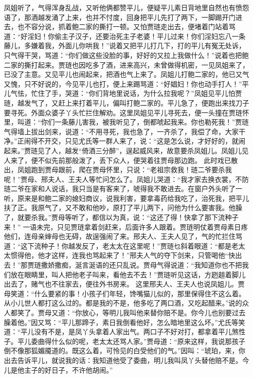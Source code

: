 \documentclass[12pt,oneside]{book}
\begin{document}
凤姐听了，气得浑身乱战，又听他俩都赞平儿，便疑平儿素日背地里自然也有愤怨语了，那酒越发涌了上来，也并不忖度，回身把平儿先打了两下，一脚踢开门进去，也不容分说，抓着鲍二家的撕打一顿。又怕贾琏走出去，便堵着门站着骂道：“好淫妇！你偷主子汉子，还要治死主子老婆！平儿过来！你们淫妇忘八一条藤儿，多嫌着我，外面儿你哄我！”说着又把平儿打几下，打的平儿有冤无处诉，只气得干哭，骂道：“你们做这些没脸的事，好好的又拉上我做什么！”说着也把鲍二家的撕打起来。贾琏也因吃多了酒，进来高兴，未曾做得机密，一见凤姐来了，已没了主意。又见平儿也闹起来，把酒也气上来了。凤姐儿打鲍二家的，他已又气又愧，只不好说的，今见平儿也打，便上来踢骂道：“好娼妇！你也动手打人！”平儿气怯，忙住了手，哭道：“你们背地里说话，为什么拉我呢？”凤姐见平儿怕贾琏，越发气了，又赶上来打着平儿，偏叫打鲍二家的。平儿急了，便跑出来找刀子要寻死。外面众婆子丫头忙拦住解劝。这里凤姐见平儿寻死去，便一头撞在贾琏怀里，叫道：“你们一条藤儿害我，被我听见了，倒都唬起我来。你也勒死我！”贾琏气得墙上拔出剑来，说道：“不用寻死，我也急了，一齐杀了，我偿了命，大家干净。”正闹得不开交，只见尤氏等一群人来了，说：“这是怎么说，才好好的，就闹起来。”贾琏见了人，越发“倚酒三分醉”，逞起威风来，故意要杀凤姐儿。凤姐儿见人来了，便不似先前那般泼了，丢下众人，便哭着往贾母那边跑。
此时戏已散出，凤姐跑到贾母跟前，爬在贾母怀里，只说：“老祖宗救我！琏二爷要杀我呢！”贾母、邢夫人、王夫人等忙问怎么了。凤姐儿哭道：“我才家去换衣裳，不防琏二爷在家和人说话，我只当是有客来了，唬得我不敢进去。在窗户外头听了一听，原来是和鲍二家的媳妇商议，说我利害，要拿毒药给我吃了，治死我，把平儿扶了正。我原气了，又不敢和他吵，原打了平儿两下，问他为什么要害我。他臊了，就要杀我。”贾母等听了，都信以为真，说：“这还了得！快拿了那下流种子来！”
一语未完，只见贾琏拿着剑赶来，后面许多人跟着。贾琏明仗着贾母素日疼他们，连母亲婶母也无碍，故逞强闹了来。邢夫人、王夫人见了，气的忙拦住骂道：“这下流种子！你越发反了，老太太在这里呢！”贾琏乜斜着眼道：“都是老太太惯得他，他才这样，连我也骂起来了！”邢夫人气的夺下剑来，只管喝他“快出去！”那贾琏撒娇撒痴，涎言涎语的还只乱说。贾母气得说道：“我知道你也不把我们放在眼睛里，叫人把他老子叫来，看他去不去！”贾琏听见这话，方趔趄着脚儿出去了，赌气也不往家去，便往外书房来。
这里邢夫人、王夫人也说凤姐儿。贾母笑道：“什么要紧的事！小孩子们年轻，馋嘴猫儿似的，那里保得住不这么着。从小儿世人都打这么过的。都是我的不是，他多吃了两口酒，又吃起醋来。”说的众人都笑了。贾母又道：“你放心，等明儿我叫他来替你赔不是。你今儿也别要过去臊着他。”因又骂：“平儿那蹄子，素日我倒看他好，怎么暗地里这么坏。”尤氏等笑道：“平儿没有不是，是凤丫头拿着人家出气。两口子不好对打，都拿着平儿煞性子。平儿委曲得什么似的呢，老太太还骂人家。”贾母道：“原来这样，我说那孩子倒不像那狐媚魇道的。既这么着，可怜见的白受他们的气。”因叫：“琥珀，来，你出去告诉平儿，就说我的话：我知道他受了委曲，明儿我叫凤丫头替他赔不是。今儿是他主子的好日子，不许他胡闹。”
\end{document}
